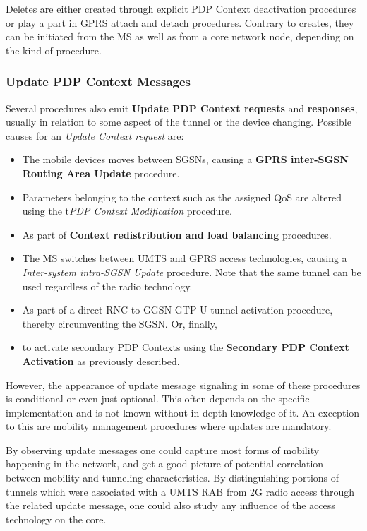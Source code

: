 Deletes are either created through explicit \gls{PDP} Context deactivation procedures or play a part in \gls{GPRS} attach and detach procedures. Contrary to creates, they can be initiated from the \gls{MS} as well as from a core network node, depending on the kind of procedure.


\subsubsection{Update \gls{PDP} Context Messages}

Several procedures also emit \textbf{Update \gls{PDP} Context requests} and \textbf{responses}, usually in relation to some aspect of the tunnel or the device changing. Possible causes for an \textit{Update Context request} are:

\begin{itemize}
	\item The mobile devices moves between \glspl{SGSN}, causing a \textbf{\gls{GPRS} inter-\gls{SGSN} Routing Area Update} procedure.
	\item Parameters belonging to the context such as the assigned \gls{QoS} are altered using the t\textit{\gls{PDP} Context Modification} procedure.
	\item As part of \textbf{Context redistribution and load balancing} procedures.
	\item The \gls{MS} switches between \gls{UMTS} and \gls{GPRS} access technologies, causing a \textit{Inter-system intra-\gls{SGSN} Update} procedure. Note that the same tunnel can be used regardless of the radio technology.
	\item As part of a direct \gls{RNC} to \gls{GGSN} \gls{GTP-U} tunnel activation procedure, thereby circumventing the \gls{SGSN}. Or, finally, 
	\item to activate secondary \gls{PDP} Contexts using the \textbf{Secondary PDP Context Activation} as previously described. 
\end{itemize}

However, the appearance of update message signaling in some of these procedures is conditional or even just optional. This often depends on the specific implementation and is not known without in-depth knowledge of it. An exception to this are mobility management procedures where updates are mandatory.

By observing update messages one could capture most forms of mobility happening in the network, and get a good picture of potential correlation between mobility and tunneling characteristics. 
By distinguishing portions of tunnels which were associated with a \gls{UMTS} \gls{RAB} from \gls{2G} radio access through the related update message, one could also study any influence of the access technology on the core.

